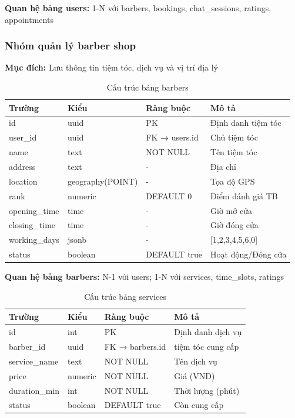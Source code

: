 \noindent\textbf{Quan hệ bảng users:} 1-N với barbers, bookings, chat\_sessions, ratings, appointments

\vspace{0.5cm}

\subsubsection{Nhóm quản lý barber shop}

\textbf{Mục đích:} Lưu thông tin tiệm tóc, dịch vụ và vị trí địa lý

\begin{table}[H]
\centering
\caption{Cấu trúc bảng barbers}
\begin{tabular}{|l|l|l|p{4.5cm}|}
\hline
\textbf{Trường} & \textbf{Kiểu} & \textbf{Ràng buộc} & \textbf{Mô tả} \\
\hline
id & uuid & PK & Định danh tiệm tóc \\
\hline
user\_id & uuid & FK → users.id & Chủ tiệm tóc \\
\hline
name & text & NOT NULL & Tên tiệm tóc \\
\hline
address & text & - & Địa chỉ \\
\hline
location & geography(POINT) & - & Tọa độ GPS \\
\hline
rank & numeric & DEFAULT 0 & Điểm đánh giá TB \\
\hline
opening\_time & time & - & Giờ mở cửa \\
\hline
closing\_time & time & - & Giờ đóng cửa \\
\hline
working\_days & jsonb & - & [1,2,3,4,5,6,0] \\
\hline
status & boolean & DEFAULT true & Hoạt động/Đóng cửa \\
\hline
\end{tabular}
\end{table}

\noindent\textbf{Quan hệ bảng barbers:} N-1 với users; 1-N với services, time\_slots, ratings

\vspace{0.3cm}

\begin{table}[H]
\centering
\caption{Cấu trúc bảng services}
\begin{tabular}{|l|l|l|p{5cm}|}
\hline
\textbf{Trường} & \textbf{Kiểu} & \textbf{Ràng buộc} & \textbf{Mô tả} \\
\hline
id & int & PK & Định danh dịch vụ \\
\hline
barber\_id & uuid & FK → barbers.id & tiệm tóc cung cấp \\
\hline
service\_name & text & NOT NULL & Tên dịch vụ \\
\hline
price & numeric & NOT NULL & Giá (VND) \\
\hline
duration\_min & int & NOT NULL & Thời lượng (phút) \\
\hline
status & boolean & DEFAULT true & Còn cung cấp \\
\hline
\end{tabular}
\end{table}

